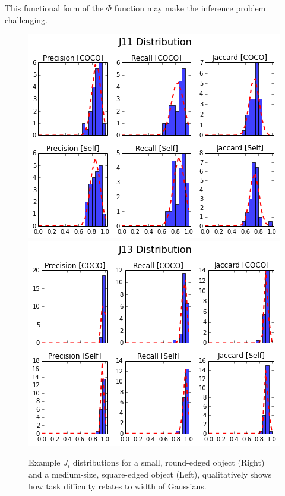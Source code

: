 \documentclass[12pt]{article}
\begin{document}

This functional form of the $\Phi$ function may make the inference problem challenging.

\begin{figure}[ht]
\centering
\includegraphics[width=0.47\linewidth]{plots/J11Wide.png}
\includegraphics[width=0.47\linewidth]{plots/J13Narrow.png}
\caption{Example $J_i$ distributions for a small, round-edged object (Right) and a medium-size, square-edged object (Left), qualitatively shows how task difficulty relates to width of Gaussians.}
\end{figure}
\end{document}
